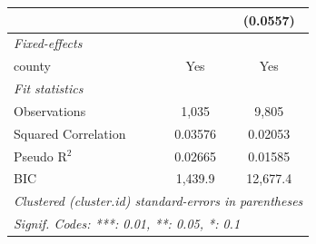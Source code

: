 \begin{tabular}{lcc}
                                                                                        &               & (0.0557)\\   
   \midrule
   \emph{Fixed-effects}\\
   county                                                                               & Yes           & Yes\\  
   \midrule
   \emph{Fit statistics}\\
   Observations                                                                         & 1,035         & 9,805\\  
   Squared Correlation                                                                  & 0.03576       & 0.02053\\  
   Pseudo R$^2$                                                                         & 0.02665       & 0.01585\\  
   BIC                                                                                  & 1,439.9       & 12,677.4\\  
   \midrule \midrule
   \multicolumn{3}{l}{\emph{Clustered (cluster.id) standard-errors in parentheses}}\\
   \multicolumn{3}{l}{\emph{Signif. Codes: ***: 0.01, **: 0.05, *: 0.1}}\\
\end{tabular}
\par\endgroup


